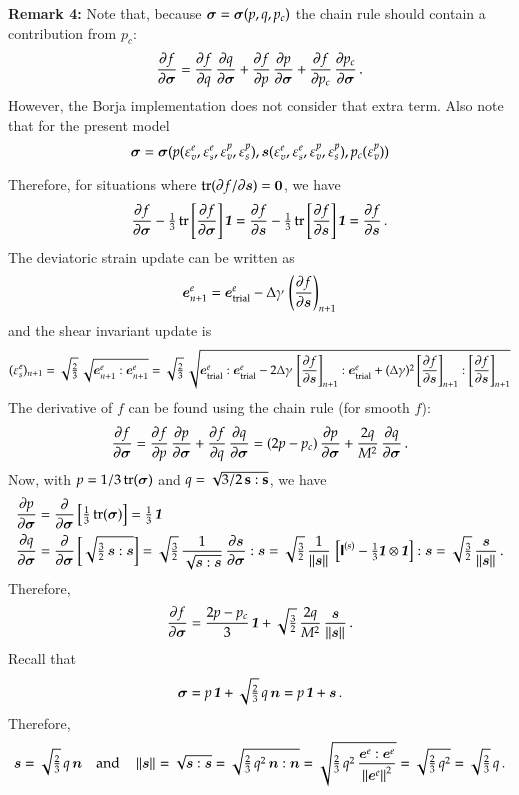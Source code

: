 \documentclass[twoside,10pt,a4paper]{article}
\begin{document}
{\footnotesize
{\bf Remark 4:}  Note that, because $\Bsig = \Bsig(p, q, p_c)$ the 
chain rule should contain a contribution from $p_c$:
\[
  \Partial{f}{\Bsig} = \Partial{f}{q}\,\Partial{q}{\Bsig} + \Partial{f}{p}\,\Partial{p}{\Bsig}
                       + \Partial{f}{p_c}\,\Partial{p_c}{\Bsig} \,.
\]
However, the Borja implementation does not consider that extra term.  Also note that for the present model
\[
  \Bsig = \Bsig(p(\Ve^e_v,\Ve^e_s,\Ve^p_v, \Ve^p_s), \BsT(\Ve^e_v, \Ve^e_s, \Ve^p_v,\Ve^p_s), p_c(\Ve^p_v))
\]
}

Therefore, for situations where $\Tr(\partial f/\partial \BsT) = \Bzero$, we have
\[
  \Partial{f}{\Bsig} - \tfrac{1}{3}\,\Tr\left[\Partial{f}{\Bsig}\right]\Bone = 
     \Partial{f}{\BsT} - \tfrac{1}{3}\,\Tr\left[\Partial{f}{\BsT}\right]\Bone =
     \Partial{f}{\BsT} \,.
\]
The deviatoric strain update can be written as
\[
  \BeT^e_{n+1} = \BeT^e_\Trial - \Delta\gamma\,\left(\Partial{f}{\BsT}\right)_{n+1} 
\]
and the shear invariant update is
\[
  (\Ve_s^e)_{n+1} = \sqrt{\tfrac{2}{3}}\,
  \sqrt{\BeT^e_{n+1}:\BeT^e_{n+1}}
  = \sqrt{\tfrac{2}{3}}\,\sqrt{\BeT^e_\Trial:\BeT^e_\Trial 
     - 2\Delta\gamma\,\left[\Partial{f}{\BsT}\right]_{n+1}:\BeT^e_\Trial
     + (\Delta\gamma)^2\left[\Partial{f}{\BsT}\right]_{n+1}:\left[\Partial{f}{\BsT}\right]_{n+1}}
\]
The derivative of $f$ can be found using the chain rule (for smooth $f$):
\[
   \Partial{f}{\Bsig} = \Partial{f}{p}\,\Partial{p}{\Bsig} + \Partial{f}{q}\,\Partial{q}{\Bsig}
     = (2p - p_c)\,\Partial{p}{\Bsig} + \frac{2q}{M^2}\,\Partial{q}{\Bsig} \,.
\]
Now, with $p = 1/3\,\Tr(\Bsig)$ and $q = \sqrt{3/2\,\Bs:\Bs}$, we have
\[
  \Bal
   \Partial{p}{\Bsig} & = \Partial{}{\Bsig}\left[\tfrac{1}{3}\,\Tr(\Bsig)\right] = \tfrac{1}{3}\,\Bone \\
   \Partial{q}{\Bsig} & = \Partial{}{\Bsig}\left[\sqrt{\tfrac{3}{2}\,\BsT:\BsT}\right]
     = \sqrt{\tfrac{3}{2}}\,\frac{1}{\sqrt{\BsT:\BsT}}\,\Partial{\BsT}{\Bsig}:\BsT
     = \sqrt{\tfrac{3}{2}}\,\frac{1}{\Norm{\BsT}{}}\,\left[\SfI^{(s)}-\tfrac{1}{3}\Bone\otimes\Bone\right]:\BsT
     = \sqrt{\tfrac{3}{2}}\,\frac{\BsT}{\Norm{\BsT}{}}\,.
  \Eal
\]
Therefore,
\[
   \Partial{f}{\Bsig} = \frac{2p - p_c}{3}\,\Bone + \sqrt{\tfrac{3}{2}}\,\frac{2q}{M^2}\,\frac{\BsT}{\Norm{\BsT}{}} \,.
\]
Recall that
\[
   \Bsig = p\,\Bone + \sqrt{\tfrac{2}{3}}\, q\, \BnT = p\,\Bone + \BsT \,.
\]
Therefore,
\[
   \BsT = \sqrt{\tfrac{2}{3}}\,q\,\BnT 
   \quad \Tand \quad
   \Norm{\BsT}{} = \sqrt{\BsT:\BsT} = \sqrt{\tfrac{2}{3}\,q^2\,\BnT:\BnT} = 
     \sqrt{\tfrac{2}{3}\,q^2\,\frac{\BeT^e:\BeT^e}{\Norm{\BeT^e}{}^2}}
     = \sqrt{\tfrac{2}{3}\,q^2} = \sqrt{\tfrac{2}{3}}\,q \,.
\]
\end{document}
